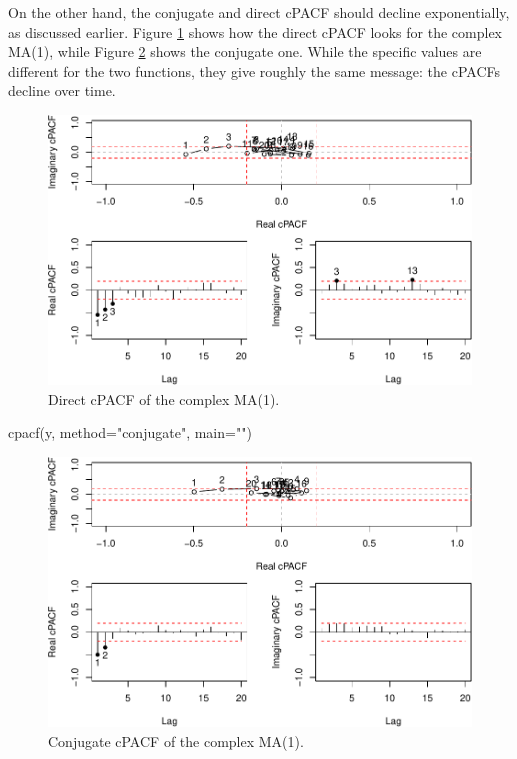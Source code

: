 \documentclass[
]{book}
\newenvironment{Shaded}{\begin{snugshade}}{\end{snugshade}}
\newcommand{\AttributeTok}[1]{\textcolor[rgb]{0.77,0.63,0.00}{#1}}
\newcommand{\FunctionTok}[1]{\textcolor[rgb]{0.00,0.00,0.00}{#1}}
\newcommand{\NormalTok}[1]{#1}
\newcommand{\StringTok}[1]{\textcolor[rgb]{0.31,0.60,0.02}{#1}}
\begin{document}
On the other hand, the conjugate and direct cPACF should decline exponentially, as discussed earlier. Figure \ref{fig:complexMA1cpACFDir} shows how the direct cPACF looks for the complex MA(1), while Figure \ref{fig:complexMA1cPACF} shows the conjugate one. While the specific values are different for the two functions, they give roughly the same message: the cPACFs decline over time.

\begin{figure}
\centering
\includegraphics{Svetunkov---Svetunkov---Complex-Valued-Econometrics_files/figure-latex/complexMA1cpACFDir-1.pdf}
\caption{\label{fig:complexMA1cpACFDir}Direct cPACF of the complex MA(1).}
\end{figure}

\begin{Shaded}
\begin{Highlighting}[]
\FunctionTok{cpacf}\NormalTok{(y, }\AttributeTok{method=}\StringTok{"conjugate"}\NormalTok{, }\AttributeTok{main=}\StringTok{""}\NormalTok{)}
\end{Highlighting}
\end{Shaded}

\begin{figure}
\centering
\includegraphics{Svetunkov---Svetunkov---Complex-Valued-Econometrics_files/figure-latex/complexMA1cPACF-1.pdf}
\caption{\label{fig:complexMA1cPACF}Conjugate cPACF of the complex MA(1).}
\end{figure}
\end{document}
